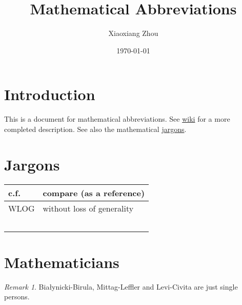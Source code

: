 \documentclass{amsart}
\numberwithin{equation}{section}
\theoremstyle{plain}
\numberwithin{equation}{section}
\theoremstyle{remark}
\newtheorem{remark}[theorem]{Remark}
\begin{document}
\date{\today}

\title
{Mathematical Abbreviations
}
\author{Xiaoxiang Zhou}
\address{School of Mathematical Sciences\\
University of Bonn\\
Bonn, 53115\\ Germany\\} 


\maketitle
\tableofcontents


\section{Introduction}
This is a document for mathematical abbreviations. See \href{https://en.wikipedia.org/wiki/List_of_mathematical_abbreviations}{wiki} for a more completed description. See also the mathematical \href{https://en.wikipedia.org/wiki/List_of_mathematical_jargon}{jargons}.

\section{Jargons}

\begin{longtable}{l|l}
\hline
c.f. & compare (as a reference) \\ \hline
WLOG & without loss of generality  \\ \hline
 & \\ \hline
 & \\ \hline
 & \\ \hline
 & \\ \hline
 & \\ \hline
\end{longtable}

\section{Mathematicians}

\begin{remark}
Białynicki-Birula, Mittag-Leffler and Levi-Civita are just single persons.
\end{remark}
\end{document}
